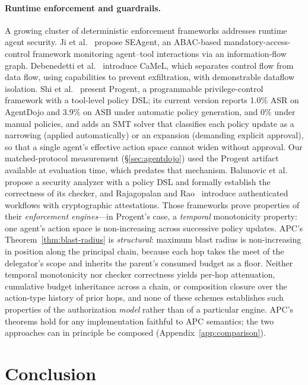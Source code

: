 \documentclass[sigconf,nonacm]{acmart}
\begin{document}
\paragraph{Runtime enforcement and guardrails.} A growing cluster of deterministic enforcement frameworks addresses runtime agent security. Ji et al.~\cite{ji2026seagent} propose SEAgent, an ABAC-based mandatory-access-control framework monitoring agent--tool interactions via an information-flow graph. Debenedetti et al.~\cite{debenedetti2025camel} introduce CaMeL, which separates control flow from data flow, using capabilities to prevent exfiltration, with demonstrable dataflow isolation. Shi et al.~\cite{shi2025progent} present Progent, a programmable privilege-control framework with a tool-level policy DSL; its current version reports 1.0\% ASR on AgentDojo and 3.9\% on ASB under automatic policy generation, and 0\% under manual policies, and adds an SMT solver that classifies each policy update as a narrowing (applied automatically) or an expansion (demanding explicit approval), so that a single agent's effective action space cannot widen without approval. Our matched-protocol measurement (\S\ref{sec:agentdojo}) used the Progent artifact available at evaluation time, which predates that mechanism. Balunovic et al.~\cite{balunovic2024formal} propose a security analyzer with a policy DSL and formally establish the correctness of its checker, and Rajagopalan and Rao~\cite{rajagopalan2026authenticated} introduce authenticated workflows with cryptographic attestations. Those frameworks prove properties of their \emph{enforcement engines}---in Progent's case, a \emph{temporal} monotonicity property: one agent's action space is non-increasing across successive policy updates. APC's Theorem~\ref{thm:blast-radius} is \emph{structural}: maximum blast radius is non-increasing in position along the principal chain, because each hop takes the meet of the delegator's scope and inherits the parent's consumed budget as a floor. Neither temporal monotonicity nor checker correctness yields per-hop attenuation, cumulative budget inheritance across a chain, or composition closure over the action-type history of prior hops, and none of these schemes establishes such properties of the authorization \emph{model} rather than of a particular engine. APC's theorems hold for any implementation faithful to APC semantics; the two approaches can in principle be composed (Appendix~\ref{app:comparison}).

\section{Conclusion}\label{sec:conclusion}
\end{document}
